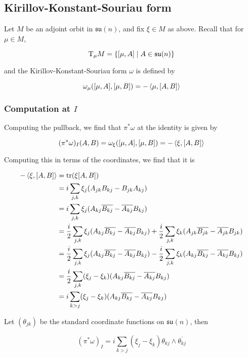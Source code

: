 \documentclass{article}
\newcommand{\su}{\mathfrak{su}}
\begin{document}
\subsection{Kirillov-Konstant-Souriau form}

Let \( M\) be an adjoint orbit in \(\su(n)\), and fix \(\xi \in  M\) as above. Recall that for \(\mu \in  M\),

\[\TT_\mu M = \left\{[\mu, A] \mid A \in \su(n)\right\}\]

and the Kirillov-Konstant-Souriau form \(\omega\) is defined by

\[\omega_\mu([\mu, A], [\mu, B]) = -\left\langle \mu, [A, B] \right\rangle\]

\subsubsection{Computation at \(I\)}

Computing the pullback, we find that \(\pi^*\omega\) at the identity is given by

\[(\pi^*\omega)_I(A, B) = \omega_\xi([\mu, A], [\mu, B]) = -\left\langle \xi, [A, B] \right\rangle\]

Computing this in terms of the coordinates, we find that it is

\begin{align*}
    -\left\langle \xi, [A, B] \right\rangle &= \tr(\xi[A, B]) \\
    &= i\sum_{j, k}\xi_j(A_{jk}B_{kj} - B_{jk}A_{kj}) \\
    &= i\sum_{j, k}\xi_j(A_{kj}\overline{B_{kj}} - \overline{A_{kj}}B_{kj}) \\
    &= \frac{i}{2} \sum_{j,k}\xi_j(A_{kj}\overline{B_{kj}} - \overline{A_{kj}}B_{kj}) + \frac{i}{2}\sum_{j, k}\xi_k(A_{jk} \overline{B_{jk}} - \overline{A_{jk}}B_{jk}) \\
    &= \frac{i}{2} \sum_{j,k}\xi_j(A_{kj}\overline{B_{kj}} - \overline{A_{kj}}B_{kj}) - \frac{i}{2}\sum_{j, k}\xi_k(A_{kj} \overline{B_{kj}} - \overline{A_{kj}}B_{kj}) \\
    &= \frac{i}{2}\sum_{j, k}(\xi_j - \xi_k)(A_{kj}\overline{B_{kj}} - \overline{A_{kj}}B_{kj}) \\
    &= i \sum_{k > j}(\xi_j - \xi_k)(A_{kj}\overline{B_{kj}} - \overline{A_{kj}}B_{kj})
\end{align*}

Let \((\theta_{jk})\) be the standard coordinate functions on \(\su(n)\), then

\[(\pi^*\omega)_I = i \sum_{k > j}(\xi_j - \xi_k)\theta_{kj}\wedge \overline{\theta_{kj}}\]
\end{document}
